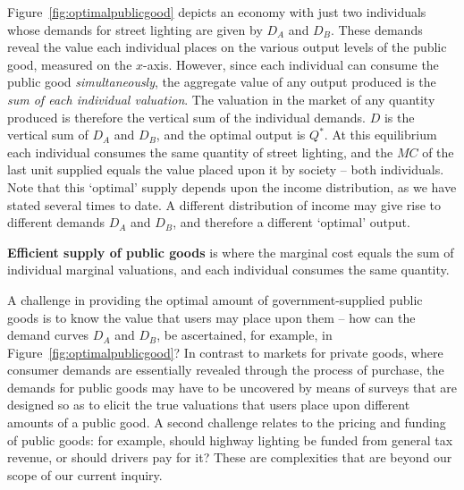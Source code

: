 Figure~\ref{fig:optimalpublicgood} depicts an economy with just two individuals whose demands for street lighting are given by $D_A$ and $D_B$. These demands reveal the value each individual places on the various output levels of the public good, measured on the $x$-axis. However, since each individual can consume the public good \textit{simultaneously}, the aggregate value of any output produced is the \textit{sum of each individual valuation}. The valuation in the market of any quantity produced is therefore the vertical sum of the individual demands. $D$ is the vertical sum of $D_A$ and $D_B$, and the optimal output is $Q^*$. At this equilibrium each individual consumes the same quantity of street lighting, and the $MC$ of the last unit supplied equals the value placed upon it by society -- both individuals. Note that this `optimal' supply depends upon the income distribution, as we have stated several times to date. A different distribution of income may give rise to different demands $D_A$ and $D_B$, and therefore a different `optimal' output.

\begin{DefBox}
\textbf{Efficient supply of public goods} is where the marginal cost equals the sum of individual marginal valuations, and each individual consumes the same quantity.
\end{DefBox}

A challenge in providing the optimal amount of government-supplied public goods is to know the value that users may place upon them -- how can the demand curves $D_A$ and $D_B$, be ascertained, for example, in Figure~\ref{fig:optimalpublicgood}? In contrast to markets for private goods, where consumer demands are essentially revealed through the process of purchase, the demands for public goods may have to be uncovered by means of surveys that are designed so as to elicit the true valuations that users place upon different amounts of a public good. A second challenge relates to the pricing and funding of public goods: for example, should highway lighting be funded from general tax revenue, or should drivers pay for it? These are complexities that are beyond our scope of our current inquiry.

